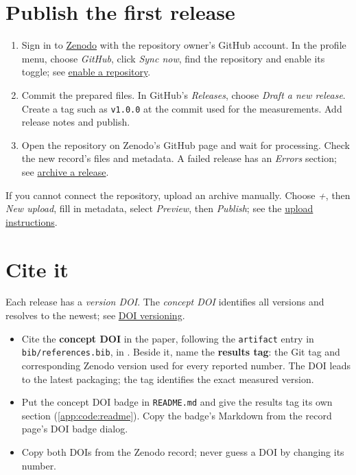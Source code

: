\section{Publish the first release}
\begin{enumerate}
  \item Sign in to \href{https://zenodo.org/}{Zenodo} with the repository owner's GitHub account. In the profile menu, choose \emph{GitHub}, click \emph{Sync now}, find the repository and enable its toggle; see \href{https://help.zenodo.org/docs/github/enable-repository/}{enable a repository}.
  \item Commit the prepared files. In GitHub's \emph{Releases}, choose \emph{Draft a new release}. Create a tag such as \texttt{v1.0.0} at the commit used for the measurements. Add release notes and publish.
  \item Open the repository on Zenodo's GitHub page and wait for processing. Check the new record's files and metadata. A failed release has an \emph{Errors} section; see \href{https://help.zenodo.org/docs/github/archive-software/github-upload/}{archive a release}.
\end{enumerate}
If you cannot connect the repository, upload an archive manually. Choose \emph{+}, then \emph{New upload}, fill in metadata, select \emph{Preview}, then \emph{Publish}; see the \href{https://help.zenodo.org/docs/deposit/create-new-upload/}{upload instructions}.

\section{Cite it}\label{app:zenodo:cite}
Each release has a \emph{version DOI}. The \emph{concept DOI} identifies all versions and resolves to the newest; see \href{https://support.zenodo.org/help/en-gb/1-upload-deposit/97-what-is-doi-versioning}{DOI versioning}.
\begin{itemize}
  \item Cite the \textbf{concept DOI} in the paper, following the \texttt{artifact} entry in \texttt{bib/references.bib}, in . Beside it, name the \textbf{results tag}: the Git tag and corresponding Zenodo version used for every reported number. The DOI leads to the latest packaging; the tag identifies the exact measured version.
  \item Put the concept DOI badge in \texttt{README.md} and give the results tag its own section (\cref{app:code:readme}). Copy the badge's Markdown from the record page's DOI badge dialog.
  \item Copy both DOIs from the Zenodo record; never guess a DOI by changing its number.
\end{itemize}

